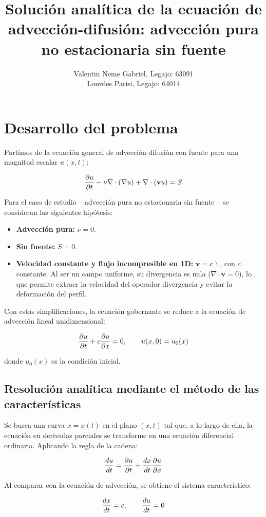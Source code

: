 \documentclass[11pt]{article}
\title{Solución analítica de la ecuación de advección-difusión: advección pura no estacionaria sin fuente}
\author{Valentin Neme Gabriel, Legajo: 63091 \\ Lourdes Parisi, Legajo: 64014}
\begin{document}
\maketitle
\thispagestyle{empty}

\section{Desarrollo del problema}

Partimos de la ecuación general de advección-difusión con fuente para una magnitud escalar $u(x,t)$:

$$
\frac{\partial u}{\partial t}  - \nu\nabla\cdot\left(\nabla u\right)  + \nabla\cdot(\mathbf{v}u)= S
$$

Para el caso de estudio -- advección pura no estacionaria sin fuente -- se consideran las siguientes hipótesis:
\begin{itemize}
    \item \textbf{Advección pura:} $\nu=0$.
    \item \textbf{Sin fuente:} $S=0$.
    \item \textbf{Velocidad constante y flujo incompresible en 1D:} $\mathbf{v}=c\,\hat\imath$, con $c$ constante. Al ser un campo uniforme, su divergencia es nula ($\nabla \cdot \mathbf{v} = 0$), lo que permite extraer la velocidad del operador divergencia y evitar la deformación del perfil.
\end{itemize}

Con estas simplificaciones, la ecuación gobernante se reduce a la ecuación de advección lineal unidimensional:

$$
\frac{\partial u}{\partial t} + c\frac{\partial u}{\partial x} = 0,
\qquad
u(x,0)=u_0(x)
$$

donde $u_0(x)$ es la condición inicial.

\subsection{Resolución analítica mediante el método de las características}

Se busca una curva $x=x(t)$ en el plano $(x,t)$ tal que, a lo largo de ella, la ecuación en derivadas parciales se transforme en una ecuación diferencial ordinaria. Aplicando la regla de la cadena:

$$
\frac{d u}{d t} = \frac{\partial u}{\partial t} + \frac{d x}{d t}\frac{\partial u}{\partial x}
$$

Al comparar con la ecuación de advección, se obtiene el sistema característico:

$$
\frac{d x}{d t}=c,
\qquad
\frac{d u}{d t}=0
$$
\end{document}
